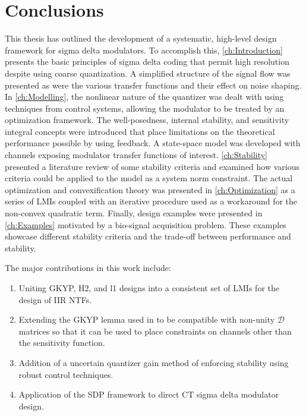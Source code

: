 
\chapter{Conclusions}
\label{ch:Conclusions}

This thesis has outlined the development of a systematic, high-level design framework for sigma delta modulators. To accomplish this, \autoref{ch:Introduction} presents the basic principles of sigma delta coding that permit high resolution despite using coarse quantization. A simplified structure of the signal flow was presented as were the various transfer functions and their effect on noise shaping. In \autoref{ch:Modelling}, the nonlinear nature of the quantizer was dealt with using techniques from control systems, allowing the modulator to be treated by an optimization framework. The well-posedness, internal stability, and sensitivity integral concepts were introduced that place limitations on the theoretical performance possible by using feedback. A state-space model was developed with channels exposing modulator transfer functions of interest. \autoref{ch:Stability} presented a literature review of some stability criteria and examined how various criteria could be applied to the model as a system norm constraint. The actual optimization and convexification theory was presented in \autoref{ch:Optimization} as a series of \gls{LMI}s coupled with an iterative procedure used as a workaround for the non-convex quadratic term. Finally, design examples were presented in \autoref{ch:Examples} motivated by a bio-signal acquisition problem. These examples showcase different stability criteria and the trade-off between performance and stability.

The major contributions in this work include:

\begin{enumerate}
	\item Uniting \gls{GKYP}, \gls{H2}, and \gls{l1} designs into a consistent set of \gls{LMI}s for the design of \gls{IIR} \gls{NTF}s.
	\item Extending the \gls{GKYP} lemma used in \cite{Li2014} to be compatible with non-unity $\mathcal{D}$ matrices so that it can be used to place constraints on channels other than the sensitivity function.
	\item Addition of a uncertain quantizer gain method of enforcing stability using robust control techniques.
	\item Application of the \gls{SDP} framework to direct \gls{CT} sigma delta modulator design.
\end{enumerate}

